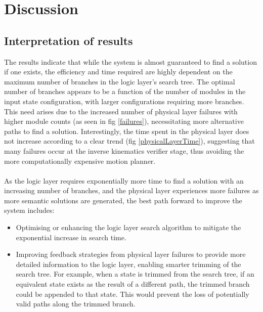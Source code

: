 \section{Discussion}
\subsection{Interpretation of results}
The results indicate that while the system is almost guaranteed to find a solution if one exists, the efficiency and time required are highly dependent on the maximum number of branches in the logic layer's search tree. The optimal number of branches appears to be a function of the number of modules in the input state configuration, with larger configurations requiring more branches. This need arises due to the increased number of physical layer failures with higher module counts (as seen in fig \ref{failures}), necessitating more alternative paths to find a solution. Interestingly, the time spent in the physical layer does not increase according to a clear trend (fig \ref{physicalLayerTime}), suggesting that many failures occur at the inverse kinematics verifier stage, thus avoiding the more computationally expensive motion planner.
\\\\
As the logic layer requires exponentially more time to find a solution with an increasing number of branches, and the physical layer experiences more failures as more semantic solutions are generated, the best path forward to improve the system includes:
\begin{itemize}[]
	\item Optimising or enhancing the logic layer search algorithm to mitigate the exponential increase in search time.
	\item Improving feedback strategies from physical layer failures to provide more detailed information to the logic layer, enabling smarter trimming of the search tree. For example, when a state is trimmed from the search tree, if an equivalent state exists as the result of a different path, the trimmed branch could be appended to that state. This would prevent the loss of potentially valid paths along the trimmed branch.
\end{itemize}

